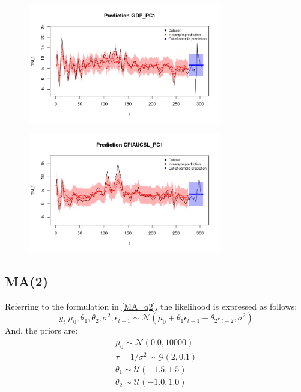\begin{figure}[H]
    \centering
    \includegraphics[width=0.75\textwidth]{images/3-MA/gdp_prediction.png}
    \label{fig:MA_first}
\end{figure}
\begin{figure}[H]
    \centering
    \includegraphics[width=0.75\textwidth]{images/3-MA/infl_prediction.png}
    \label{fig:MA_second}
\end{figure}

\subsection*{MA(2)}
\label{MA(2)}
Referring to the formulation in \ref{MA_q2}, the likelihood is expressed as follows:
$$
y_t | \mu_0, \theta_1, \theta_2, \sigma^2, \epsilon_{t-1} \sim \mathcal{N}(\mu_0 + \theta_1 \epsilon_{t-1} + \theta_2 \epsilon_{t-2},\sigma^2)
$$
And, the priors are:
\begin{equation}
    \begin{split}
        \mu_0 \sim \mathcal{N}(0.0, 10000) \\
        \tau = 1 / \sigma^2 \sim \mathcal{G}(2, 0.1) \\
        \theta_1 \sim \mathcal{U}(-1.5, 1.5) \\
        \theta_2 \sim \mathcal{U}(-1.0, 1.0)
    \end{split}
\end{equation}

